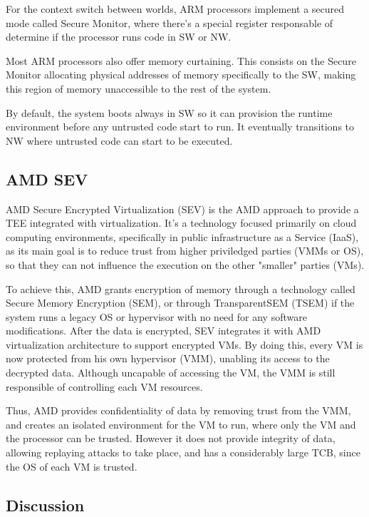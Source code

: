 For the context switch between worlds, ARM processors implement a secured mode called Secure Monitor, where there's a special register responsable of determine if the processor runs code in SW or NW. 

Most ARM processors also offer memory curtaining. This consists on the Secure Monitor allocating physical addresses of memory specifically to the SW, making this region of memory unaccessible to the rest of the system.

By default, the system boots always in SW so it can provision the runtime environment before any untrusted code start to run. It eventually transitions to NW where untrusted code can start to be executed. \cite{armTZPaper}


\subsection{AMD SEV}
\label{ssec:amdsev}

AMD Secure Encrypted Virtualization (SEV) is the AMD approach to provide a TEE integrated with virtualization. It's a technology focused primarily on cloud computing environments, specifically in public infrastructure as a Service (IaaS), as its main goal is to reduce trust from higher priviledged parties (VMMs or OS), so that they can not influence the execution on the other "smaller" parties (VMs). 

To achieve this, AMD grants encryption of memory through a technology called Secure Memory Encryption (SEM), or through TransparentSEM (TSEM) if the system runs a legacy OS or hypervisor with no need for any software modifications.
After the data is encrypted, SEV integrates it with AMD virtualization architecture to support encrypted VMs. By doing this, every VM is now protected from his own hypervisor (VMM), unabling its access to the decrypted data. Although uncapable of accessing the VM, the VMM is still responsible of controlling each VM resources. \cite{amdPaper}

Thus, AMD provides confidentiality of data by removing trust from the VMM, and creates an isolated environment for the VM to run, where only the VM and the processor can be trusted. However it does not provide integrity of data, allowing replaying attacks to take place, and has a considerably large TCB, since the OS of each VM is trusted. \cite{amdSEVPaper}


\subsection{Discussion}
\label{ssec:tee_discussion}

